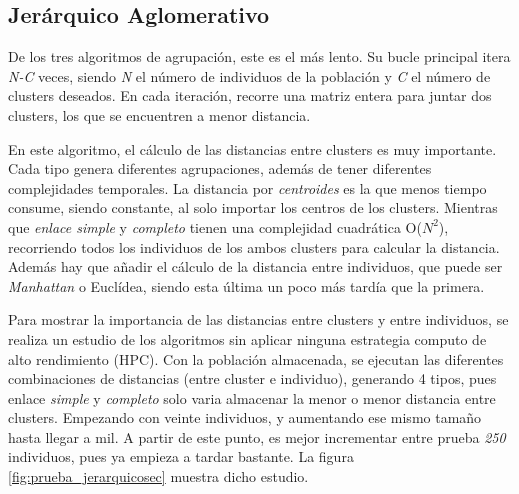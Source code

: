 

	\subsection{Jerárquico Aglomerativo}
	
		De los tres algoritmos de agrupación, este es el más lento. Su bucle principal itera \textit{N-C} veces, siendo \textit{N} el número de individuos de la población y \textit{C} el número de clusters deseados. En cada iteración, recorre una matriz entera para juntar dos clusters, los que se encuentren a menor distancia. 
		
		
		En este algoritmo, el cálculo de las distancias entre clusters es muy importante. Cada tipo genera diferentes agrupaciones, además de tener diferentes complejidades temporales. La distancia por \textit{centroides} es la que menos tiempo consume, siendo constante, al solo importar los centros de los clusters. Mientras que \textit{enlace simple} y \textit{completo} tienen una complejidad cuadrática O(\(N^{2}\)), recorriendo todos los individuos de los ambos clusters para calcular la distancia. Además hay que añadir el cálculo de la distancia entre individuos, que puede ser \textit{Manhattan} o Euclídea, siendo esta última un poco más tardía que la primera.
		

		Para mostrar la importancia de las distancias entre clusters y entre individuos, se realiza un estudio de los algoritmos sin aplicar ninguna estrategia computo de alto rendimiento (HPC). Con la población almacenada, se ejecutan las diferentes combinaciones de distancias (entre cluster e individuo), generando 4 tipos, pues enlace \textit{simple} y \textit{completo} solo varia almacenar la menor o menor distancia entre clusters. Empezando con veinte individuos, y aumentando ese mismo tamaño hasta llegar a mil. A partir de este punto, es mejor incrementar entre prueba \textit{250} individuos, pues ya empieza a tardar bastante. La figura \ref{fig:prueba_jerarquicosec} muestra dicho estudio. 
		
